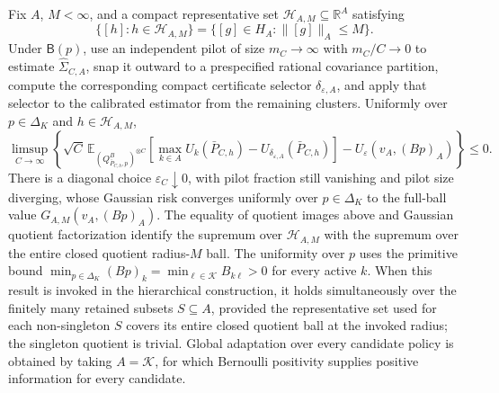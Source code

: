 Fix \(A\), \(M<\infty\), and a compact representative set \(\mathscr H_{A,M}\subseteq\mathbb R^A\) satisfying
\[
\{[h]:h\in\mathscr H_{A,M}\}
=\{[g]\in H_A:\lVert[g]\rVert_A\leq M\}.
\]
Under \(\mathsf B(p)\), use an independent pilot of size \(m_C\to\infty\) with \(m_C/C\to0\) to estimate \(\widehat\Sigma_{C,A}\), snap it outward to a prespecified rational covariance partition, compute the corresponding compact certificate selector \(\delta_{\varepsilon,A}\), and apply that selector to the calibrated estimator from the remaining clusters.  Uniformly over \(p\in\Delta_K\) and \(h\in\mathscr H_{A,M}\),
\[
\limsup_{C\to\infty}\left\{\sqrt C\,\mathbb E_{(Q^B_{\bar P_{C,h},p})^{\otimes C}}
\left[\max_{k\in A}U_k(\bar P_{C,h})-U_{\delta_{\varepsilon,A}}(\bar P_{C,h})\right]
-U_\varepsilon(v_A,(Bp)_A)\right\}\leq0.
\]
There is a diagonal choice \(\varepsilon_C\downarrow0\), with pilot fraction still vanishing and pilot size diverging, whose Gaussian risk converges uniformly over \(p\in\Delta_K\) to the full-ball value \(G_{A,M}(v_A,(Bp)_A)\).  The equality of quotient images above and Gaussian quotient factorization identify the supremum over \(\mathscr H_{A,M}\) with the supremum over the entire closed quotient radius-\(M\) ball.  The uniformity over \(p\) uses the primitive bound \(\min_{p\in\Delta_K}(Bp)_k=\min_{\ell\in\mathcal K}B_{k\ell}>0\) for every active \(k\).  When this result is invoked in the hierarchical construction, it holds simultaneously over the finitely many retained subsets \(S\subseteq A\), provided the representative set used for each non-singleton \(S\) covers its entire closed quotient ball at the invoked radius; the singleton quotient is trivial.  Global adaptation over every candidate policy is obtained by taking \(A=\mathcal K\), for which Bernoulli positivity supplies positive information for every candidate.